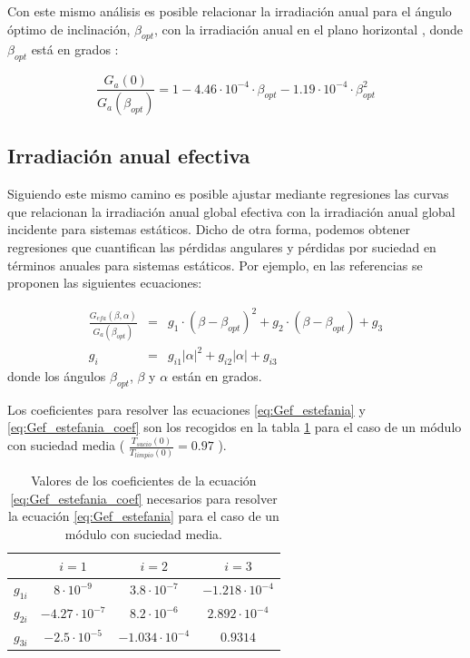 Con este mismo análisis es posible relacionar la irradiación anual
para el ángulo óptimo de inclinación, $\beta_{opt}$, con la irradiación
anual en el plano horizontal , donde $\beta_{opt}$ está en grados
\cite{Caamano1998,Lorenzo2006c}:

\begin{equation}
\frac{G_{a}(0)}{G_{a}(\beta_{opt})}=1-4.46\cdot10^{-4}\cdot\beta_{opt}-1.19\cdot10^{-4}\cdot\beta_{opt}^{2}
\label{eq:GbetaOpt}
\end{equation}



\subsection{Irradiación anual efectiva}

Siguiendo este mismo camino es posible ajustar mediante regresiones
las curvas que relacionan la irradiación anual global efectiva con
la irradiación anual global incidente para sistemas estáticos. Dicho
de otra forma, podemos obtener regresiones que cuantifican las pérdidas
angulares y pérdidas por suciedad en términos anuales para sistemas
estáticos. Por ejemplo, en las referencias \cite{Caamano1998,Lorenzo2002}
se proponen las siguientes ecuaciones:

\begin{eqnarray}
\frac{G_{efa}(\beta,\alpha)}{G_{a}(\beta_{opt})} & = & g_{1}\cdot(\beta-\beta_{opt})^{2}+g_{2}\cdot(\beta-\beta_{opt})+g_{3}\label{eq:Gef_estefania}\\
g_{i} & = & g_{i1}|\alpha|^{2}+g_{i2}|\alpha|+g_{i3}\label{eq:Gef_estefania_coef}\end{eqnarray}
donde los ángulos $\beta_{opt}$, $\beta$ y $\alpha$ están en grados.

Los coeficientes para resolver las ecuaciones \ref{eq:Gef_estefania}
y \ref{eq:Gef_estefania_coef} son los recogidos en la tabla \ref{tab:CoefGef}
para el caso de un módulo con suciedad media ( $\frac{T_{sucio}(0)}{T_{limpio}(0)}=0.97$
).


\begin{table}
\begin{centering}
\begin{tabular}{cccc}
\toprule 
 & $i=1$ & $i=2$ & $i=3$\tabularnewline
\midrule
\midrule 
$g_{1i}$ & $8\cdot10^{-9}$ & $3.8\cdot10^{-7}$ & $-1.218\cdot10^{-4}$\tabularnewline
\midrule 
$g_{2i}$ & $-4.27\cdot10^{-7}$ & $8.2\cdot10^{-6}$ & $2.892\cdot10^{-4}$\tabularnewline
\midrule 
$g_{3i}$ & $-2.5\cdot10^{-5}$ & $-1.034\cdot10^{-4}$ & $0.9314$\tabularnewline
\bottomrule
\end{tabular}
\par\end{centering}

\caption{Valores de los coeficientes de la ecuación \ref{eq:Gef_estefania_coef}
necesarios para resolver la ecuación \ref{eq:Gef_estefania} para
el caso de un módulo con suciedad media.\label{tab:CoefGef}}

\end{table}


